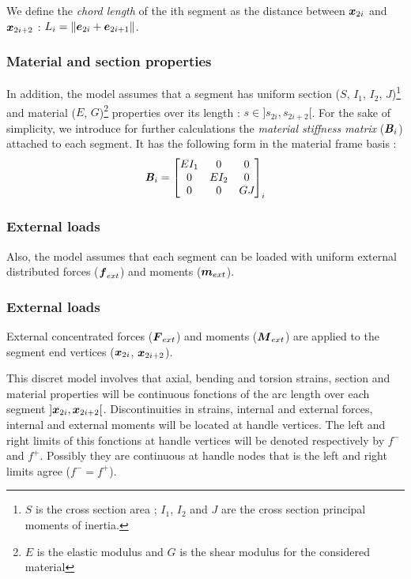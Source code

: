 We define the \emph{chord length} of the ith segment as the distance between $\boldsymbol{x}_{2i}$ and $\boldsymbol{x}_{2i+2}$ : $L_i = \lVert\boldsymbol{e}_{2i} + \boldsymbol{e}_{2i+1}\rVert$.

\subsubsection{Material and section properties}

In addition, the model assumes that a segment has uniform section ($S$, $I_1$, $I_2$, $J$)\footnote{$S$ is the cross section area ; $I_1$, $I_2$ and $J$ are the cross section principal moments of inertia.} and material ($E$, $G$)\footnote{$E$ is the elastic modulus and $G$ is the shear  modulus for the considered material} properties over its length : $s \in ]s_{2i},s_{2i+2}[$. For the sake of simplicity, we introduce for further calculations the \emph{material stiffness matrix} ($\boldsymbol{\mathit{B}}_i$) attached to each segment. It has the following form in the material frame basis :
\begin{equation}
	\boldsymbol{\mathit{B}}_i = \begin{bmatrix} 
			EI_1		&	0		&	0		\\
			0		&	EI_{2}	&	0		\\
			0		&	0		&	GJ_{}	\\
		\end{bmatrix}_i
\end{equation}
 

\subsubsection{External loads}

Also, the model assumes that each segment can be loaded with uniform external distributed forces ($\boldsymbol{f}_{ext}$) and moments ($\boldsymbol{m}_{ext}$).





\subsubsection{External loads}

External concentrated forces ($\boldsymbol{F}_{ext}$) and moments ($\boldsymbol{M}_{ext}$) are applied to the segment end vertices ($\boldsymbol{x}_{2i}$,  $\boldsymbol{x}_{2i+2}$).

This discret model involves that axial, bending and torsion strains, section and material properties will be continuous fonctions of the arc length over each segment $]\boldsymbol{x}_{2i},  \boldsymbol{x}_{2i+2}[$. Discontinuities in strains, internal and external forces, internal and external moments will be located at handle vertices. The left and right limits of this fonctions at handle vertices will be denoted respectively by $f^-$ and $f^+$. Possibly they are continuous at handle nodes that is the left and right limits agree ($f^- = f^+$).

